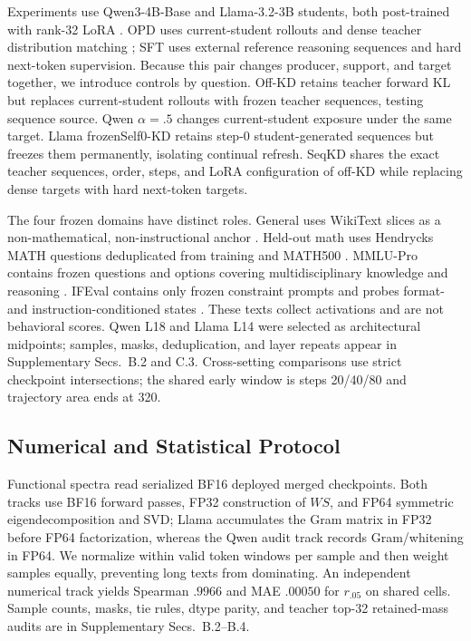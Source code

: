 \documentclass[letterpaper]{article} %
\begin{document}
Experiments use Qwen3-4B-Base and Llama-3.2-3B students, both post-trained with rank-32
LoRA \citep{hu2022lora,qwen2025technical,meta2024llama32}. OPD uses current-student rollouts and dense
teacher distribution matching \citep{verl2025opd}; SFT uses external reference reasoning sequences and hard
next-token supervision. Because this pair changes producer, support, and target together,
we introduce controls by question. Off-KD retains teacher forward KL but replaces
current-student rollouts with frozen teacher sequences, testing sequence source. Qwen
$\alpha=.5$ changes current-student exposure under the same target. Llama frozenSelf0-KD
retains step-0 student-generated sequences but freezes them permanently, isolating
continual refresh. SeqKD shares the exact teacher sequences, order, steps, and LoRA
configuration of off-KD while replacing dense targets with hard next-token targets.

The four frozen domains have distinct roles. General uses WikiText slices as a
non-mathematical, non-instructional anchor \citep{merity2017pointer}. Held-out math uses Hendrycks MATH questions
deduplicated from training and MATH500 \citep{hendrycks2021math}. MMLU-Pro contains frozen questions and options
covering multidisciplinary knowledge and reasoning \citep{wang2024mmlupro}. IFEval contains only frozen
constraint prompts and probes format- and instruction-conditioned states \citep{zhou2023ifeval}. These texts
collect activations and are not behavioral scores. Qwen L18 and Llama L14 were selected
as architectural midpoints; samples, masks, deduplication, and layer repeats appear in
Supplementary Secs.~B.2 and C.3. Cross-setting comparisons use strict checkpoint
intersections; the shared early window is steps 20/40/80 and trajectory area ends at 320.

\subsection{Numerical and Statistical Protocol}

Functional spectra read serialized BF16 deployed merged checkpoints. Both tracks use BF16 forward passes, FP32 construction of $WS$, and FP64 symmetric eigendecomposition and SVD; Llama accumulates the Gram matrix in FP32 before FP64 factorization, whereas the Qwen audit track records Gram/whitening in FP64. We normalize within valid token windows per sample and then weight samples equally, preventing long texts from dominating. An independent numerical track yields Spearman $.9966$ and MAE $.00050$ for $r_{.05}$ on shared cells. Sample counts, masks, tie rules, dtype parity, and teacher top-32 retained-mass audits are in Supplementary Secs.~B.2--B.4.
\end{document}
